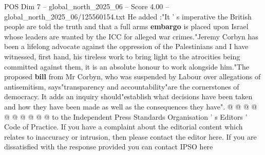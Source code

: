 \begin{textsample}{POS Dim 7 – global\_north\_2025\_06 – Score 4.00 – global\_north\_2025\_06/125560154.txt}
He added :"It ' s imperative the British people are told the truth and that a full arms \textbf{embargo} is placed upon Israel whose leaders are wanted by the ICC for alleged war crimes."Jeremy Corbyn has been a lifelong advocate against the oppression of the Palestinians and I have witnessed, first hand, his tireless work to bring light to the atrocities being committed against them, it is an absolute honour to work alongside him."The proposed \textbf{bill} from Mr Corbyn, who was suspended by Labour over allegations of antisemitism, says"transparency and accountability"are the cornerstones of democracy.
It adds an inquiry should"establish what decisions have been taken and how they have been made as well as the consequences they have". @ @ @ @ @ @ @ @ @ @ to the Independent Press Standards Organisation ' s Editors ' Code of Practice.
If you have a complaint about the editorial content which relates to inaccuracy or intrusion, then please contact the editor here.
If you are dissatisfied with the response provided you can contact IPSO here

\end{textsample}
